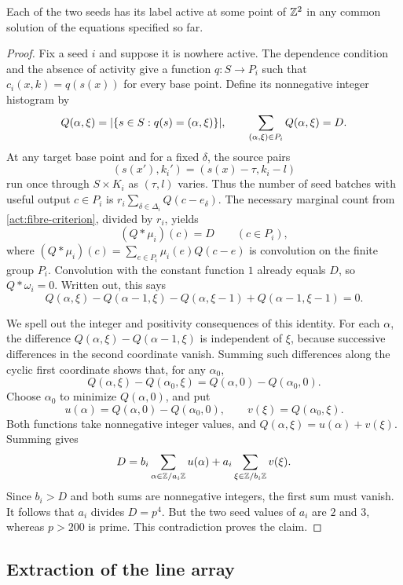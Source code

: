 \begin{lemma}
\label{act:seed}
Each of the two seeds has its label active at some point of $\mathbb Z^2$
in any common solution of the equations specified so far.
\end{lemma}

\begin{proof}
Fix a seed $i$ and suppose it is nowhere active.  The dependence
condition and the absence of activity give a function $q:S\to P_i$
such that $c_i(x,k)=q(s(x))$ for every base point.  Define its
nonnegative integer histogram by
\[
 Q(\alpha,\xi)
 =\lvert\{s\in S:q(s)=(\alpha,\xi)\}\rvert,
 \qquad
 \sum_{(\alpha,\xi)\in P_i}Q(\alpha,\xi)=D.
\]
At any target base point and for a fixed $\delta$, the source pairs
\[
 (s(x'),k_i')=(s(x)-\tau,k_i-l)
\]
run once through $S\times K_i$ as $(\tau,l)$ varies.  Thus the
number of seed batches with useful output $c\in P_i$ is
$r_i\sum_{\delta\in\Delta_i}Q(c-e_\delta)$.  The necessary marginal
count from \cref{act:fibre-criterion}, divided by $r_i$, yields
\[
 (Q*\mu_i)(c)=D\qquad(c\in P_i),
\]
where $(Q*\mu_i)(c)=\sum_{e\in P_i}\mu_i(e)Q(c-e)$ is convolution
on the finite group $P_i$.  Convolution with the constant function
$1$ already equals $D$, so $Q*\omega_i=0$.  Written out, this says
\begin{equation}
\label{act:mixed-difference}
 Q(\alpha,\xi)-Q(\alpha-1,\xi)
 -Q(\alpha,\xi-1)+Q(\alpha-1,\xi-1)=0.
\end{equation}

We spell out the integer and positivity consequences of this identity.
For each $\alpha$, the difference
$Q(\alpha,\xi)-Q(\alpha-1,\xi)$ is independent of $\xi$, because
successive differences in the second coordinate vanish.  Summing such
differences along the cyclic first coordinate shows that, for any
$\alpha_0$,
\[
 Q(\alpha,\xi)-Q(\alpha_0,\xi)
   =Q(\alpha,0)-Q(\alpha_0,0).
\]
Choose $\alpha_0$ to minimize $Q(\alpha,0)$, and put
\[
 u(\alpha)=Q(\alpha,0)-Q(\alpha_0,0),
 \qquad v(\xi)=Q(\alpha_0,\xi).
\]
Both functions take nonnegative integer values, and
$Q(\alpha,\xi)=u(\alpha)+v(\xi)$.  Summing gives
\[
 D=b_i\sum_{\alpha\in\mathbb Z/a_i\mathbb Z}u(\alpha)
     +a_i\sum_{\xi\in\mathbb Z/b_i\mathbb Z}v(\xi).
\]
Since $b_i>D$ and both sums are nonnegative integers, the first sum
must vanish.  It follows that $a_i$ divides $D=p^4$.  But the two
seed values of $a_i$ are $2$ and $3$, whereas $p>200$ is prime.  This
contradiction proves the claim.
\end{proof}

\subsection{Extraction of the line array}

